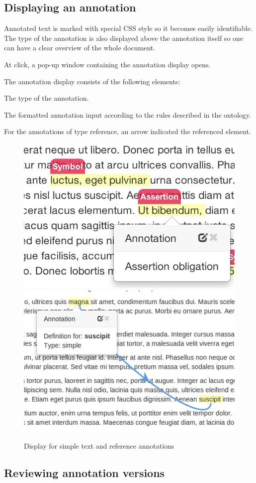 \subsection{Displaying an annotation}

Annotated text is marked with special CSS style so it becomes easily identifiable.  The
type of the annotation is also displayed above the annotation itself so one can have a
clear overview of the whole document.

At click, a pop-up window containing the annotation display opens.

The annotation display consists of the following elements:
\begin{compactenum}
\item The type of the annotation.
\item The formatted annotation input according to the rules described in the ontology.
\item For the annotations of type reference, an arrow indicated the referenced element.
\end{compactenum}

\begin{figure}[ht]\centering
\includegraphics[width=.4\textwidth]{../PIC/suscipit}\quad
\includegraphics[width=.5\textwidth]{../PIC/definition}
\caption{Display for simple text and reference annotations}\label{fig:suscipit-definition}
\end{figure}

\subsection{Reviewing annotation versions}

